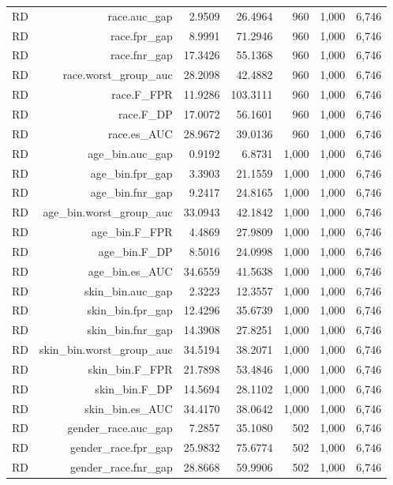 \documentclass[10pt]{article}
\begin{document}
\begin{longtable}{@{}lrrrrrr@{}}
RD & race.auc\_gap & 2.9509 & 26.4964 & 960 & 1,000 & 6,746 \\
RD & race.fpr\_gap & 8.9991 & 71.2946 & 960 & 1,000 & 6,746 \\
RD & race.fnr\_gap & 17.3426 & 55.1368 & 960 & 1,000 & 6,746 \\
RD & race.worst\_group\_auc & 28.2098 & 42.4882 & 960 & 1,000 & 6,746 \\
RD & race.F\_FPR & 11.9286 & 103.3111 & 960 & 1,000 & 6,746 \\
RD & race.F\_DP & 17.0072 & 56.1601 & 960 & 1,000 & 6,746 \\
RD & race.es\_AUC & 28.9672 & 39.0136 & 960 & 1,000 & 6,746 \\
RD & age\_bin.auc\_gap & 0.9192 & 6.8731 & 1,000 & 1,000 & 6,746 \\
RD & age\_bin.fpr\_gap & 3.3903 & 21.1559 & 1,000 & 1,000 & 6,746 \\
RD & age\_bin.fnr\_gap & 9.2417 & 24.8165 & 1,000 & 1,000 & 6,746 \\
RD & age\_bin.worst\_group\_auc & 33.0943 & 42.1842 & 1,000 & 1,000 & 6,746 \\
RD & age\_bin.F\_FPR & 4.4869 & 27.9809 & 1,000 & 1,000 & 6,746 \\
RD & age\_bin.F\_DP & 8.5016 & 24.0998 & 1,000 & 1,000 & 6,746 \\
RD & age\_bin.es\_AUC & 34.6559 & 41.5638 & 1,000 & 1,000 & 6,746 \\
RD & skin\_bin.auc\_gap & 2.3223 & 12.3557 & 1,000 & 1,000 & 6,746 \\
RD & skin\_bin.fpr\_gap & 12.4296 & 35.6739 & 1,000 & 1,000 & 6,746 \\
RD & skin\_bin.fnr\_gap & 14.3908 & 27.8251 & 1,000 & 1,000 & 6,746 \\
RD & skin\_bin.worst\_group\_auc & 34.5194 & 38.2071 & 1,000 & 1,000 & 6,746 \\
RD & skin\_bin.F\_FPR & 21.7898 & 53.4846 & 1,000 & 1,000 & 6,746 \\
RD & skin\_bin.F\_DP & 14.5694 & 28.1102 & 1,000 & 1,000 & 6,746 \\
RD & skin\_bin.es\_AUC & 34.4170 & 38.0642 & 1,000 & 1,000 & 6,746 \\
RD & gender\_race.auc\_gap & 7.2857 & 35.1080 & 502 & 1,000 & 6,746 \\
RD & gender\_race.fpr\_gap & 25.9832 & 75.6774 & 502 & 1,000 & 6,746 \\
RD & gender\_race.fnr\_gap & 28.8668 & 59.9906 & 502 & 1,000 & 6,746 \\

\end{longtable}
\end{document}
